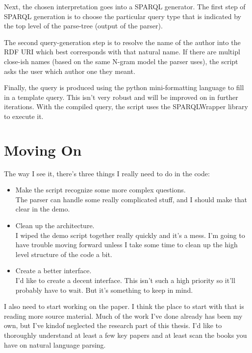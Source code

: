 \documentclass[11pt]{article}
\begin{document}
Next, the chosen interpretation goes into a SPARQL generator.
The first step of SPARQL generation is to choose the particular
query type that is indicated by the top level of the parse-tree (output of the
parser).

The second query-generation step is to resolve the name of the author 
into the RDF URI which best corresponds with that natural name. 
If there are multipl close-ish names (based on the same N-gram model the parser
uses), the script asks the user which author one they meant.

Finally, the query is produced using the python mini-formatting language to fill
in a template query. This isn't very robust and will be improved on in further
iterations. With the compiled query, the script uses the SPARQLWrapper 
library to execute it.

\section*{Moving On}
The way I see it, there's three things I really need to do in the code:
\begin{itemize}
\item Make the script recognize some more complex questions. \\
    The parser can handle some really complicated stuff, and I should make that clear
    in the demo.
\item Clean up the architecture. \\
    I wiped the demo script together really quickly and it's a mess. I'm going to
    have trouble moving forward unless I take some time to clean up the high level
    structure of the code a bit.
\item Create a better interface. \\
    I'd like to create a decent interface. This isn't such a high priority so it'll
    probably have to wait. But it's something to keep in mind.
\end{itemize}

I also need to start working on the paper. I think the place to start with that is
reading more source material. Much of the work I've done already has been my own,
but I've kindof neglected the research part of this thesis. I'd like to thoroughly
understand at least a few key papers and at least scan the books you have on
natural language parsing.

%
\end{document}
